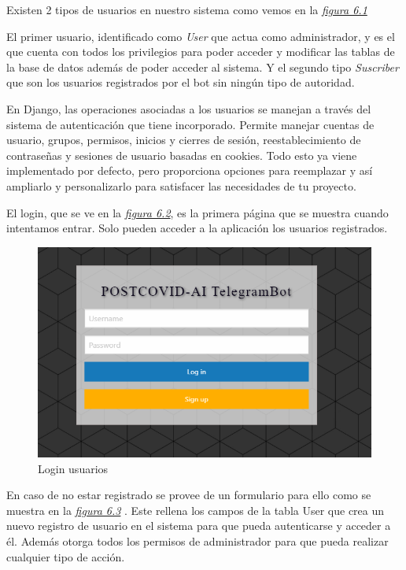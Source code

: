 Existen 2 tipos de usuarios en nuestro sistema como vemos en la \textit{\hyperref[fig:usuarios]{figura 6.1}}

El primer usuario, identificado como \textit{User} que actua como administrador, y es el que cuenta con  todos los privilegios para poder acceder y modificar las tablas de la base de datos además de poder acceder al sistema. Y el segundo tipo \textit{Suscriber} que son los usuarios registrados por el bot sin ningún tipo de autoridad. 

En Django, las operaciones asociadas a los usuarios se manejan a través del sistema de autenticación que tiene incorporado. Permite manejar cuentas de usuario, grupos, permisos, inicios y cierres de sesión, reestablecimiento de contraseñas y sesiones de usuario basadas en cookies. Todo esto ya viene implementado por defecto, pero proporciona opciones para reemplazar y así ampliarlo y personalizarlo para satisfacer las necesidades de tu proyecto.

El login, que se ve en la \textit{\hyperref[fig:login]{figura 6.2}}, es la primera página que se muestra cuando intentamos entrar. Solo pueden acceder a la aplicación los usuarios registrados.

\begin{figure}[!ht]
    \centering
    \includegraphics[width=1\textwidth]{imagenes/login.png}
    \caption{ Login usuarios }
    \label{fig:login}
\end{figure}
\vspace{0.8cm}

En caso de no estar registrado se provee de un formulario para ello como se muestra en la \textit{\hyperref[fig:general]{figura 6.3}} . Este rellena los campos de la tabla User que crea un nuevo registro de usuario en el sistema para que pueda autenticarse y acceder a él. Además otorga todos los permisos de administrador para que pueda realizar cualquier tipo de acción. \vspace{0.3cm}



